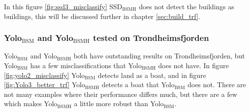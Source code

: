 \noindent
In this figure \ref{fig:ssd3_misclassify} SSD$_{\text{BSMH}}$ does not detect the buildings as buildings, this will be discussed further in chapter \ref{sec:build_trf}.

\vspace{3mm}

\subsubsection{Yolo$_{\text{BSM}}$ and Yolo$_{\text{BSMH}}$ tested on Trondheimsfjorden}

Yolo$_{\text{BSM}}$ and Yolo$_{\text{BSMH}}$ both have outstanding results on Trondheimsfjorden, but Yolo$_{\text{BSM}}$ has a few misclassifications that Yolo$_{\text{BSMH}}$ does not have. In figure \ref{fig:yolo2_misclassify} Yolo$_{\text{BSM}}$ detects land as a boat, and in figure \ref{fig:Yolo3_better_trf} Yolo$_{\text{BSMH}}$ detects a boat that Yolo$_{\text{BSM}}$ does not. There are not many examples where their performance differs much, but there are a few which makes Yolo$_{\text{BSMH}}$ a little more robust than Yolo$_{\text{BSM}}$.

